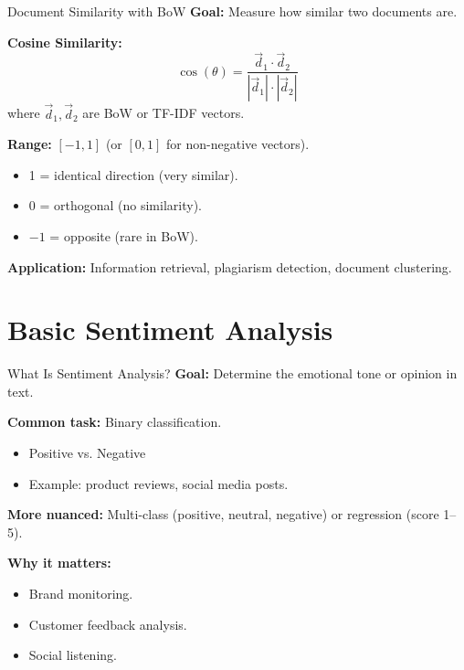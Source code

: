 \documentclass[10pt]{beamer}
\begin{document}
\begin{frame}{Document Similarity with BoW}
    \textbf{Goal:} Measure how similar two documents are.

    \vspace{0.2cm}
    \textbf{Cosine Similarity:}
    \[
        \cos(\theta) = \frac{\vec{d}_1 \cdot \vec{d}_2}{|\vec{d}_1| \cdot |\vec{d}_2|}
    \]
    where $\vec{d}_1, \vec{d}_2$ are BoW or TF-IDF vectors.

    \vspace{0.2cm}
    \textbf{Range:} $[{-1, 1}]$ (or $[0, 1]$ for non-negative vectors).
    \begin{itemize}
        \item 1 = identical direction (very similar).
        \item 0 = orthogonal (no similarity).
        \item $-1$ = opposite (rare in BoW).
    \end{itemize}

    \vspace{0.2cm}
    \textbf{Application:} Information retrieval, plagiarism detection, document clustering.
\end{frame}

\section{Basic Sentiment Analysis}

\begin{frame}{What Is Sentiment Analysis?}
    \textbf{Goal:} Determine the emotional tone or opinion in text.

    \vspace{0.2cm}
    \textbf{Common task:} Binary classification.
    \begin{itemize}
        \item Positive vs. Negative
        \item Example: product reviews, social media posts.
    \end{itemize}

    \vspace{0.2cm}
    \textbf{More nuanced:} Multi-class (positive, neutral, negative) or regression (score 1--5).

    \vspace{0.2cm}
    \textbf{Why it matters:}
    \begin{itemize}
        \item Brand monitoring.
        \item Customer feedback analysis.
        \item Social listening.
    \end{itemize}
\end{frame}
\end{document}
